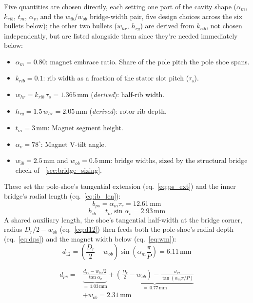 \documentclass[10pt,final,journal,a4paper,oneside,twocolumn]{IEEEtran}
\begin{document}
Five quantities are chosen directly, each setting one part of the cavity shape ($\alpha_m$, $k_{rib}$, $t_m$, $\alpha_v$, and the $w_{ib}$/$w_{ob}$ bridge-width pair, five design choices across the six bullets below); the other two bullets ($w_{hr}$, $h_{ry}$) are derived from $k_{rib}$, not chosen independently, but are listed alongside them since they're needed immediately below:
\begin{itemize}[nosep]
    \item $\alpha_m=0.80$: magnet embrace ratio. Share of the pole pitch the pole shoe spans.
    \item $k_{rib}=0.1$: rib width as a fraction of the stator slot pitch ($\tau_s$).
    \item $w_{hr} = k_{rib}\,\tau_s = 1.365\,\text{mm}$ (\emph{derived}): half-rib width.
    \item $h_{ry} = 1.5\,w_{hr} = 2.05\,\text{mm}$ (\emph{derived}): rotor rib depth.
    \item $t_m=3\,\text{mm}$: Magnet segment height.
    \item $\alpha_v=78^\circ$: Magnet V-tilt angle.
    \item $w_{ib}=2.5\,\text{mm}$ and $w_{ob}=0.5\,\text{mm}$: bridge widths, sized by the structural bridge check of \sectionname~\ref{sec:bridge_sizing}.
\end{itemize}

These set the pole-shoe's tangential extension (eq.~\ref{eq:ps_ext}) and the inner bridge's radial length (eq.~\ref{eq:ib_len}):
\begin{equation}
    \label{eq:ps_ext}
    b_{ps} = \alpha_m\tau_r = 12.61\,\text{mm}
\end{equation}
\begin{equation}
    \label{eq:ib_len}
    h_{ib} = t_m\sin\alpha_v = 2.93\,\text{mm}
\end{equation}
A shared auxiliary length, the shoe's tangential half-width at the bridge corner, radius $D_r/2-w_{ob}$ (eq.~\ref{eq:d12}) then feeds both the pole-shoe's radial depth (eq.~\ref{eq:dps}) and the magnet width below (eq.~\ref{eq:wm}):
\begin{equation}
    \label{eq:d12}
    d_{12} = \left(\frac{D_r}{2}-w_{ob}\right)\sin\!\left(\alpha_m\frac{\pi}{P}\right) = 6.11\,\text{mm}
\end{equation}

\begin{equation}
    \label{eq:dps}
    \begin{split}
    d_{ps} = {}& \underbrace{\frac{d_{12}-w_{ib}/2}{\tan\alpha_v}}_{=\,1.03\,\text{mm}}
    + \underbrace{\left(\frac{D_r}{2}-w_{ob}\right) - \frac{d_{12}}{\tan(\alpha_m\pi/P)}}_{=\,0.77\,\text{mm}} \\
    &+ w_{ob} = 2.31\,\text{mm}
    \end{split}
\end{equation}
\end{document}
